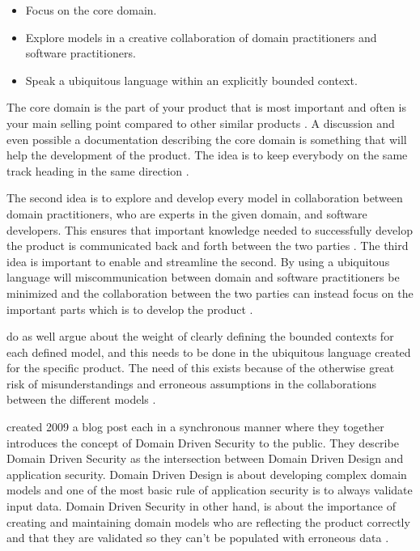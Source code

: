 \begin{itemize}
	\item Focus on the core domain.
	\item Explore models in a creative collaboration of domain practitioners and software practitioners.
	\item Speak a ubiquitous language within an explicitly bounded context.
\end{itemize}

The core domain is the part of your product that is most important and often is your main selling point compared to other similar products \parencite{millett_2015}. A discussion and even possible a documentation describing the core domain is something that will help the development of the product. The idea is to keep everybody on the same track heading in the same direction \parencite{EvansEric2004Dd:t}.

The second idea is to explore and develop every model in collaboration between domain practitioners, who are experts in the given domain, and software developers. This ensures that important knowledge needed to successfully develop the product is communicated back and forth between the two parties \parencite{millett_2015}. The third idea is important to enable and streamline the second. By using a ubiquitous language will miscommunication between domain and software practitioners be minimized and the collaboration between the two parties can instead focus on the important parts which is to develop the product \parencite{evans_2015}.

\textcite{evans_2015} do as well argue about the weight of clearly defining the bounded contexts for each defined model, and this needs to be done in the ubiquitous language created for the specific product. The need of this exists because of the otherwise great risk of misunderstandings and erroneous assumptions in the collaborations between the different models \parencite{millett_2015}.

\textcite{Wilander2009, Johnsson2009} created 2009 a blog post each in a synchronous manner where they together introduces the concept of Domain Driven Security to the public. They describe Domain Driven Security as the intersection between Domain Driven Design and application security. Domain Driven Design is about developing complex domain models and one of the most basic rule of application security is to always validate input data. Domain Driven Security in other hand, is about the importance of creating and maintaining domain models who are reflecting the product correctly and that they are validated so they can't be populated with erroneous data \parencite{Wilander2009, Johnsson2009, Arnor2016, Stendahl2016}.


